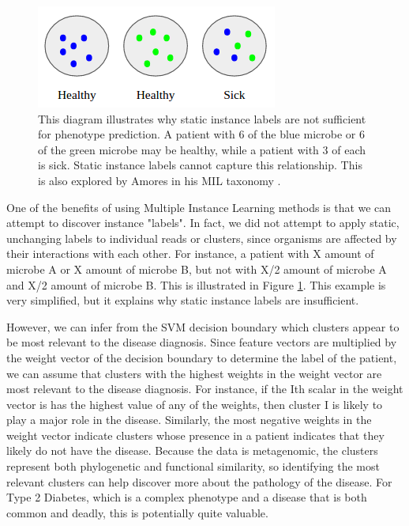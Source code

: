 \begin{figure}[t]
\centering
\includegraphics[scale=0.5]{./instance-labels.png}
\caption{This diagram illustrates why static instance labels are not sufficient for phenotype prediction. A patient with 6 of the blue microbe or 6 of the green microbe may be healthy, while a patient with 3 of each is sick. Static instance labels cannot capture this relationship. This is also explored by Amores in his MIL taxonomy \cite{amores13}.} \label{instance-labels}
\end{figure}

One of the benefits of using Multiple Instance Learning methods is that we can attempt to discover instance "labels". In fact, we did not attempt to apply static, unchanging labels to individual reads or clusters, since organisms are affected by their interactions with each other. For instance, a patient with X amount of microbe A or X amount of microbe B, but not with X/2 amount of microbe A and X/2 amount of microbe B. This is illustrated in Figure \ref{instance-labels}. This example is very simplified, but it explains why static instance labels are insufficient.

However, we can infer from the SVM decision boundary which clusters appear to be most relevant to the disease diagnosis. Since feature vectors are multiplied by the weight vector of the decision boundary to determine the label of the patient, we can assume that clusters with the highest weights in the weight vector are most relevant to the disease diagnosis. For instance, if the Ith scalar in the weight vector is has the highest value of any of the weights, then cluster I is likely to play a major role in the disease. Similarly, the most negative weights in the weight vector indicate clusters whose presence in a patient indicates that they likely do not have the disease. Because the data is metagenomic, the clusters represent both phylogenetic and functional similarity, so identifying the most relevant clusters can help discover more about the pathology of the disease. For Type 2 Diabetes, which is a complex phenotype and a disease that is both common and deadly, this is potentially quite valuable.